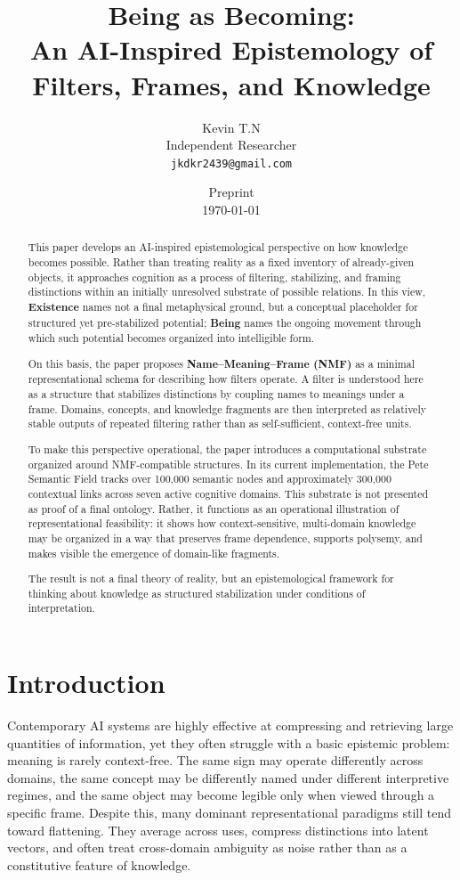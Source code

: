 \documentclass[11pt,a4paper]{article}
\title{\textbf{Being as Becoming:}\\
An AI-Inspired Epistemology of Filters, Frames, and Knowledge}
\author{
  Kevin T.N \\
  Independent Researcher \\
  \texttt{jkdkr2439@gmail.com}
}
\date{Preprint \\ \today}
\newcommand{\nmf}{\textbf{Name--Meaning--Frame (NMF)}}
\newcommand{\term}[1]{\textbf{#1}}
\begin{document}
\maketitle

\begin{abstract}
This paper develops an AI-inspired epistemological perspective on how knowledge becomes possible. Rather than treating reality as a fixed inventory of already-given objects, it approaches cognition as a process of filtering, stabilizing, and framing distinctions within an initially unresolved substrate of possible relations. In this view, \term{Existence} names not a final metaphysical ground, but a conceptual placeholder for structured yet pre-stabilized potential; \term{Being} names the ongoing movement through which such potential becomes organized into intelligible form.

On this basis, the paper proposes \nmf{} as a minimal representational schema for describing how filters operate. A filter is understood here as a structure that stabilizes distinctions by coupling names to meanings under a frame. Domains, concepts, and knowledge fragments are then interpreted as relatively stable outputs of repeated filtering rather than as self-sufficient, context-free units.

To make this perspective operational, the paper introduces a computational substrate organized around NMF-compatible structures. In its current implementation, the Pete Semantic Field tracks over 100{,}000 semantic nodes and approximately 300{,}000 contextual links across seven active cognitive domains. This substrate is not presented as proof of a final ontology. Rather, it functions as an operational illustration of representational feasibility: it shows how context-sensitive, multi-domain knowledge may be organized in a way that preserves frame dependence, supports polysemy, and makes visible the emergence of domain-like fragments.

The result is not a final theory of reality, but an epistemological framework for thinking about knowledge as structured stabilization under conditions of interpretation.
\end{abstract}

\section{Introduction}

Contemporary AI systems are highly effective at compressing and retrieving large quantities of information, yet they often struggle with a basic epistemic problem: meaning is rarely context-free. The same sign may operate differently across domains, the same concept may be differently named under different interpretive regimes, and the same object may become legible only when viewed through a specific frame. Despite this, many dominant representational paradigms still tend toward flattening. They average across uses, compress distinctions into latent vectors, and often treat cross-domain ambiguity as noise rather than as a constitutive feature of knowledge.
\end{document}
